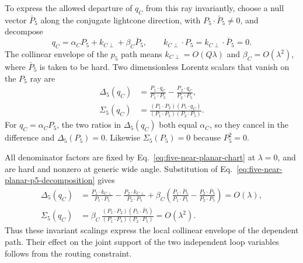 \documentclass[a4paper,11pt]{article}
\begin{document}
To express the allowed departure of \(q_C\) from this ray invariantly, choose
a null vector \(\bar P_5\) along the conjugate lightcone direction, with
\(P_5\mathbin\cdot\bar P_5\ne0\), and decompose
\begin{equation}
 q_C=\alpha_CP_5+k_{C\perp}+\beta_C\bar P_5,
 \qquad
 k_{C\perp}\mathbin\cdot P_5
 =k_{C\perp}\mathbin\cdot\bar P_5=0.
 \label{eq:five-near-planar-p5-decomposition}
\end{equation}
The collinear envelope of the \(p_5\) path means
\(k_{C\perp}=O(Q\lambda)\) and
\(\beta_C=O(\lambda^2)\), where \(\bar P_5\) is taken to be hard.
Two dimensionless Lorentz scalars that vanish on the \(P_5\) ray
are
\begin{equation}
\begin{aligned}
 \Delta_5(q_C)&=
 \frac{P_1\mathbin\cdot q_C}
      {P_1\mathbin\cdot P_5}
 -\frac{P_2\mathbin\cdot q_C}
      {P_2\mathbin\cdot P_5},\\[1mm]
 \Sigma_5(q_C)&=
 \frac{
 (P_1\mathbin\cdot P_2)
 (P_5\mathbin\cdot q_C)}
 {(P_1\mathbin\cdot P_5)
  (P_2\mathbin\cdot P_5)}.
\end{aligned}
\label{eq:five-near-planar-invariant-mismatches}
\end{equation}
For \(q_C=\alpha_CP_5\), the two ratios in \(\Delta_5(q_C)\) both
equal \(\alpha_C\), so they cancel in the difference and
\(\Delta_5(P_5)=0\).  Likewise \(\Sigma_5(P_5)=0\) because \(P_5^2=0\).

All denominator factors are fixed by
Eq.~\eqref{eq:five-near-planar-chart} at \(\lambda=0\), and are hard and
nonzero at generic wide angle.
Substitution of Eq.~\eqref{eq:five-near-planar-p5-decomposition} gives
\begin{align}
 \Delta_5(q_C)
 &=\frac{P_1\mathbin\cdot k_{C\perp}}
        {P_1\mathbin\cdot P_5}
   -\frac{P_2\mathbin\cdot k_{C\perp}}
        {P_2\mathbin\cdot P_5}
   +\beta_C\left(
      \frac{P_1\mathbin\cdot\bar P_5}
           {P_1\mathbin\cdot P_5}
     -\frac{P_2\mathbin\cdot\bar P_5}
           {P_2\mathbin\cdot P_5}\right)
 =O(\lambda),\nonumber\\
 \Sigma_5(q_C)
 &=\beta_C\,
   \frac{
   (P_1\mathbin\cdot P_2)
   (P_5\mathbin\cdot\bar P_5)}
   {(P_1\mathbin\cdot P_5)
    (P_2\mathbin\cdot P_5)}
 =O(\lambda^2).
 \label{eq:five-near-planar-invariant-widths}
\end{align}
Thus these invariant scalings express the local collinear envelope of the
dependent path.  Their effect on the joint support of the two independent
loop variables follows from the routing constraint.
\end{document}
